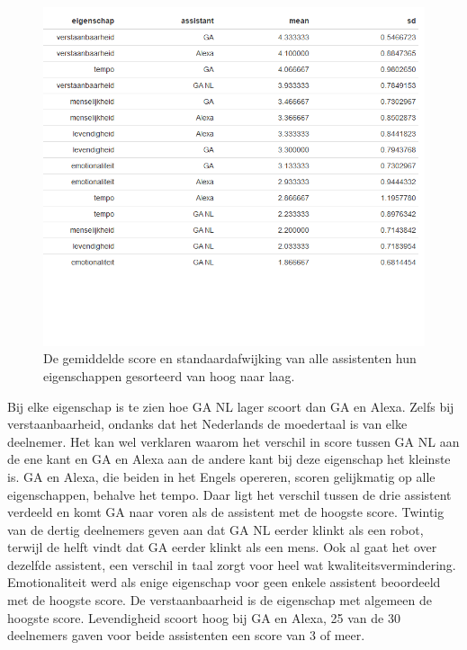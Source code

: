 \begin{figure}[h]
    \includegraphics[width=0.9\linewidth]{../onderzoek/onderzoeksresultaten/vergelijking_assistenten_per_eigenschap/table_mean_sd_scores}
    \caption{De gemiddelde score en standaardafwijking van alle assistenten hun eigenschappen gesorteerd van hoog naar laag.}
    \label{fig:table-mean-sd-scores}
\end{figure}

Bij elke eigenschap is te zien hoe \gls{GA NL} lager scoort dan \gls{GA} en Alexa. Zelfs bij verstaanbaarheid, ondanks dat het Nederlands de moedertaal is van elke deelnemer. Het kan wel verklaren waarom het verschil in score tussen \gls{GA NL} aan de ene kant en \gls{GA} en Alexa aan de andere kant bij deze eigenschap het kleinste is. \gls{GA} en Alexa, die beiden in het Engels opereren, scoren gelijkmatig op alle eigenschappen, behalve het tempo. Daar ligt het verschil tussen de drie assistent verdeeld en komt \gls{GA} naar voren als de assistent met de hoogste score.
Twintig van de dertig deelnemers geven aan dat \gls{GA NL} eerder klinkt als een robot, terwijl de helft vindt dat \gls{GA} eerder klinkt als een mens. Ook al gaat het over dezelfde assistent, een verschil in taal zorgt voor heel wat kwaliteitsvermindering.
Emotionaliteit werd als enige eigenschap voor geen enkele assistent beoordeeld met de hoogste score. De verstaanbaarheid is de eigenschap met algemeen de hoogste score.
Levendigheid scoort hoog bij \gls{GA} en Alexa, 25 van de 30 deelnemers gaven voor beide assistenten een score van 3 of meer.

